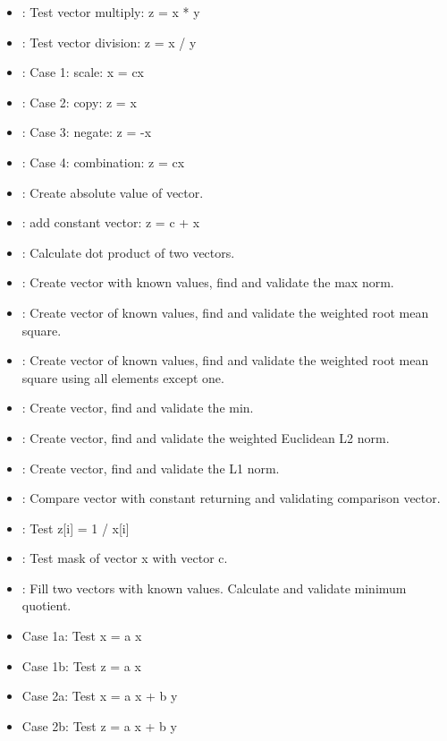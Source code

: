 \begin{itemize}
\item {}: Test vector multiply: z = x * y
\item {}: Test vector division: z = x / y
\item {}: Case 1: scale: x = cx
\item {}: Case 2: copy: z = x
\item {}: Case 3: negate: z = -x
\item {}: Case 4: combination: z = cx
\item {}: Create absolute value of vector. 
\item {}: add constant vector: z = c + x
\item {}: Calculate dot product of two vectors.
\item {}: Create vector with known values, find and validate the max norm.
\item {}: Create vector of known values, find and validate the weighted root mean square.
\item {}: Create vector of known values, find and validate the weighted root mean square using all elements except one.
\item {}: Create vector, find and validate the min.
\item {}: Create vector, find and validate the weighted Euclidean L2 norm.
\item {}: Create vector, find and validate the L1 norm.
\item {}: Compare vector with constant returning and validating comparison vector.
\item {}: Test z[i] = 1 / x[i]
\item {}: Test mask of vector x with vector c.
\item {}: Fill two vectors with known values. Calculate and validate minimum quotient.
\item {} Case 1a: Test x = a x
\item {} Case 1b: Test z = a x
\item {} Case 2a: Test x = a x + b y
\item {} Case 2b: Test z = a x + b y

\end{itemize}
